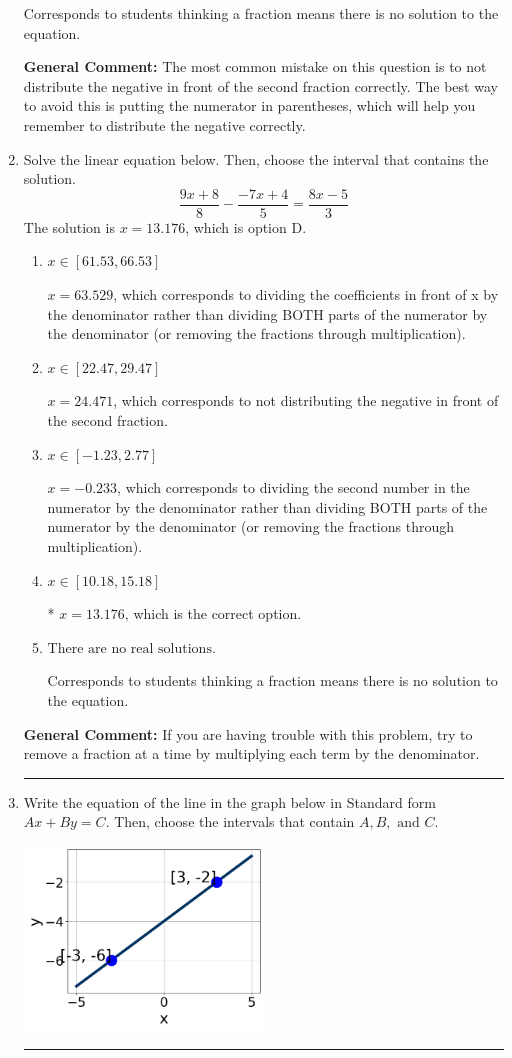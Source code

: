 \documentclass{extbook}[14pt]
\newcommand{\litem}[1]{\item #1

\rule{\textwidth}{0.4pt}}
\begin{document}
\begin{enumerate}
{\begin{enumerate}[label=\Alph*.]
Corresponds to students thinking a fraction means there is no solution to the equation.
\end{enumerate}

\textbf{General Comment:} The most common mistake on this question is to not distribute the negative in front of the second fraction correctly. The best way to avoid this is putting the numerator in parentheses, which will help you remember to distribute the negative correctly.
}
\litem{
Solve the linear equation below. Then, choose the interval that contains the solution.
\[ \frac{9x + 8}{8} - \frac{-7x + 4}{5} = \frac{8x -5}{3} \]The solution is \( x = 13.176 \), which is option D.\begin{enumerate}[label=\Alph*.]
\item \( x \in [61.53, 66.53] \)

 $x = 63.529$, which corresponds to dividing the coefficients in front of x by the denominator rather than dividing BOTH parts of the numerator by the denominator (or removing the fractions through multiplication).
\item \( x \in [22.47, 29.47] \)

 $x = 24.471$, which corresponds to not distributing the negative in front of the second fraction.
\item \( x \in [-1.23, 2.77] \)

 $x = -0.233$, which corresponds to dividing the second number in the numerator by the denominator rather than dividing BOTH parts of the numerator by the denominator (or removing the fractions through multiplication).
\item \( x \in [10.18, 15.18] \)

* $x = 13.176$, which is the correct option.
\item \( \text{There are no real solutions.} \)

Corresponds to students thinking a fraction means there is no solution to the equation.
\end{enumerate}

\textbf{General Comment:} If you are having trouble with this problem, try to remove a fraction at a time by multiplying each term by the denominator.
}
\litem{
Write the equation of the line in the graph below in Standard form $Ax+By=C$. Then, choose the intervals that contain $A, B, \text{ and } C$.

\begin{center}
    \includegraphics[width=0.5\textwidth]{../Figures/linearGraphToStandardCopyB.png}
\end{center}


}
\end{enumerate}
\end{document}
